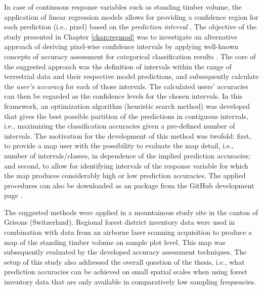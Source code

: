 In case of continuous response variables such as standing timber volume, the application of linear regression models allows for providing a confidence region for each prediction (i.e., pixel) based on the \textit{prediction interval} \citep[pp.136--139]{fahrmeir2013}. The objective of the study presented in Chapter \ref{chap:regmod} was to investigate an alternative approach of deriving pixel-wise confidence intervals by applying well-known concepts of accuracy assessment for categorical classification results \citep{congalton2008}. The core of the suggested approach was the definition of intervals within the range of terrestrial data and their respective model predictions, and subsequently calculate the \textit{user's accuracy} for each of those intervals. The calculated users' accuracies can then be regarded as the confidence levels for the chosen intervals. In this framework, an optimization algorithm (heuristic search method) was developed that gives the best possible partition of the predictions in contiguous intervals, i.e., maximizing the classification accuracies given a pre-defined number of intervals. The motivation for the development of this method was twofold: first, to provide a map user with the possibility to evaluate the map detail, i.e., number of intervals/classes, in dependence of the implied prediction accuracies; and second, to allow for identifying intervals of the response variable for which the map produces considerably high or low prediction accuracies. The applied procedures can also be downloaded as an  package from the GitHub development page \citep{github_classoptimr}.\par 

The suggested methods were applied in a mountainous study site in the canton of Grisons (Switzerland). Regional forest district inventory data were used in combination with data from an airborne laser scanning acquisition to produce a map of the standing timber volume on sample plot level. This map was subsequently evaluated by the developed accuracy assessment techniques. The setup of this study also addressed the overall question of the thesis, i.e., what prediction accuracies can be achieved on small spatial scales when using forest inventory data that are only available in comparatively low sampling frequencies.


